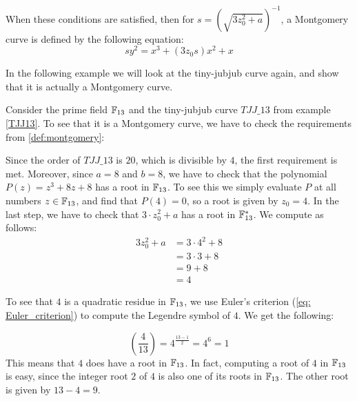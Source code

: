 When these conditions are satisfied, then for $s=({\sqrt{3z_0^{2}+a}})^{-1}$, a Montgomery curve is defined by the following equation:
\begin{equation}\label{eq:montgomery-form}
sy^{2}=x^{3}+(3z_0 s)x^{2}+x
\end{equation}

In the following example we will look at the tiny-jubjub curve again, and show that it is actually a Montgomery curve.
\begin{example}\label{TJJ13-montgomery}
Consider the prime field $\mathbb{F}_{13}$ and the tiny-jubjub curve $\mathit{TJJ\_13}$ from example \ref{TJJ13}. To see that it is a Montgomery curve, we have to check the requirements from \ref{def:montgomery}: 

Since the order  of $\mathit{TJJ\_13}$ is $20$, which is divisible by $4$, the first requirement is met. Moreover, since $a=8$ and $b=8$, we have to check that the polynomial $P(z) = z^3 + 8z + 8$ has a root in $\mathbb{F}_{13}$. To see this we simply evaluate $P$ at all numbers $z\in \mathbb{F}_{13}$, and find that $P(4)=0$, so a root is given by $z_0=4$. In the last step, we have to check that $3\cdot z_0^2 + a$ has a root in $\mathbb{F}_{13}^*$. We compute as follows:
\begin{align*}
3z_0^2 + a & = 3\cdot 4^2 + 8 \\
           & = 3 \cdot 3 + 8 \\
           & = 9 + 8 \\
           & = 4
\end{align*}

To see that $4$ is a quadratic residue in $\mathbb{F}_{13}$, we use Euler's criterion (\ref{eq: Euler_criterion}) to compute the Legendre symbol of $4$. We get the following:

$$
\left(\frac{4}{13}\right) = 4^{\frac{13-1}{2}} = 4^6 = 1
$$ 
This means that $4$ does have a root in $\mathbb{F}_{13}$. In fact, computing a root of $4$ in $\mathbb{F}_{13}$ is easy, since the integer root $2$ of $4$ is also one of its roots in $\mathbb{F}_{13}$. The other root is given by $13-4=9$.


\end{example}
